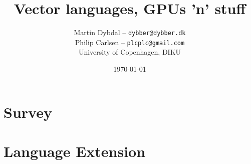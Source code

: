 \documentclass[10pt,a4paper,final,oneside,openany]{memoir}
\title{
      Vector languages, GPUs 'n' stuff
}
\author{
  Martin Dybdal -- \texttt{dybber@dybber.dk} \\
  Philip Carlsen -- \texttt{plcplc@gmail.com}
\\
University of Copenhagen, DIKU}
\date{\today}
\begin{document}


\newpage
\renewcommand*{\cftpartname}{Part\space}
\tableofcontents*





\part{Survey}


\part{Language Extension}



\newpage
{}
\printbibliography
\end{document}
